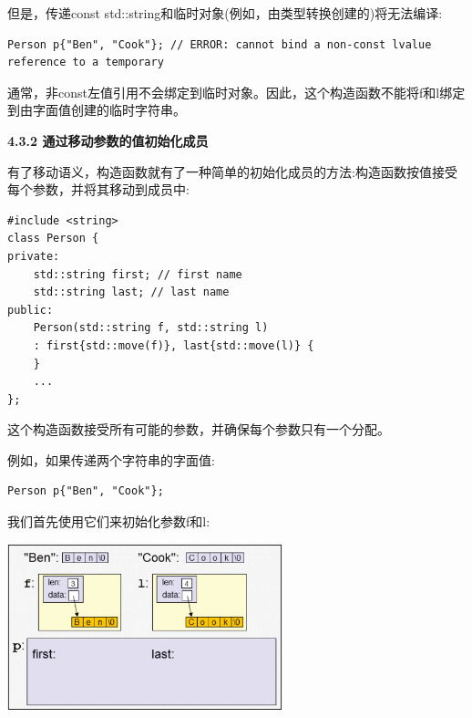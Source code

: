 但是，传递const std::string和临时对象(例如，由类型转换创建的)将无法编译:\par

\begin{lstlisting}[caption={}]
Person p{"Ben", "Cook"}; // ERROR: cannot bind a non-const lvalue reference to a temporary
\end{lstlisting}

通常，非const左值引用不会绑定到临时对象。因此，这个构造函数不能将f和l绑定到由字面值创建的临时字符串。\par

\hspace*{\fill} \par %
\textbf{4.3.2 通过移动参数的值初始化成员}

有了移动语义，构造函数就有了一种简单的初始化成员的方法:构造函数按值接受每个参数，并将其移动到成员中:\par

{\color{red}{basics/initmove.hpp}}

\begin{lstlisting}[caption={}]
#include <string>
class Person {
private:
	std::string first; // first name
	std::string last; // last name
public:
	Person(std::string f, std::string l)
	: first{std::move(f)}, last{std::move(l)} {
	}
	...
};
\end{lstlisting}

这个构造函数接受所有可能的参数，并确保每个参数只有一个分配。\par

例如，如果传递两个字符串的字面值:\par

\begin{lstlisting}[caption={}]
Person p{"Ben", "Cook"};
\end{lstlisting}

我们首先使用它们来初始化参数f和l:\par

\begin{center}
	\includegraphics[width=0.6\textwidth]{content/1/chapter4/images/4}
\end{center}

